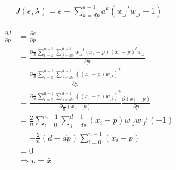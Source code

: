 \documentclass[runningheads,openany]{xhlPaper}
\begin{document}
\begin{equation}
\label{equ:pcaConstraintFunction}
\begin{aligned}
J\left( {e,\lambda } \right) = e + \sum\limits_{k = {dp}}^{d - 1} {{a ^k}\left( {{w_{\_j}}^t{w_{\_j}} - 1} \right)} 
\end{aligned}
\end{equation}

\begin{equation}
\label{equ:pcaDerivationToP}
\begin{aligned}
\frac{{\partial J}}{{\partial p}} &= \frac{{\partial e}}{{\partial p}}\\
 &= \frac{{\partial \frac{1}{n}\sum\limits_{i = 0}^{n - 1} {\sum\limits_{j = {dp}}^{d - 1} {{w_{\_j}}^t\left( {{x_i} - p} \right){{\left( {{x_i} - p} \right)}^t}{w_{\_j}}} } }}{{\partial p}}\\
 &= \frac{{\partial \frac{1}{n}\sum\limits_{i = 0}^{n - 1} {\sum\limits_{j = {dp}}^{d - 1} {{{\left( {\left( {{x_i} - p} \right){w_{\_j}}} \right)}^2}} } }}{{\partial p}}\\
 &= \frac{{\partial \frac{1}{n}\sum\limits_{i = 0}^{n - 1} {\sum\limits_{j = {dp}}^{d - 1} {{{\left( {\left( {{x_i} - p} \right){w_{\_j}}} \right)}^2}} } }}{{\partial \frac{1}{n}\left( {{x_i} - p} \right)}}\frac{{\partial \left( {{x_i} - p} \right)}}{{\partial p}}\\
 &= \frac{2}{n}\sum\limits_{i = 0}^{n - 1} {\sum\limits_{j = {dp}}^{d - 1} {\left( {{x_i} - p} \right)w{}_{\_j}{w_{\_j}}^t} } \left( { - 1} \right)\\
 &=  - \frac{2}{n}\left( {d - {dp}} \right)\sum\limits_{i = 0}^{n - 1} {\left( {{x_i} - p} \right)}  \\
 &= 0 \\
 &\Rightarrow p = {\bar x}
\end{aligned}
\end{equation}
\end{document}
